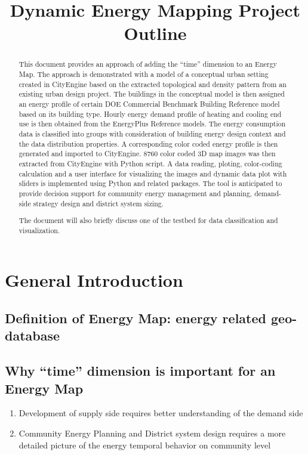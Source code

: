 \documentclass[12pt]{article}
\begin{document}
\title{Dynamic Energy Mapping Project Outline}
\maketitle
\begin{abstract}
  This document provides an approach of adding the ``time'' dimension
  to an Energy Map. The approach is demonstrated with a model of a
  conceptual urban setting created in CityEngine based on the
  extracted topological and density pattern from an existing urban
  design project. The buildings in the conceptual model is then
  assigned an energy profile of certain DOE Commercial Benchmark
  Building Reference model based on its building type. Hourly energy
  demand profile of heating and cooling end use is then obtained from
  the EnergyPlus Reference models. The energy consumption data is
  classified into groups with consideration of building energy design
  context and the data distribution properties. A corresponding color
  coded energy profile is then generated and imported to
  CityEngine. 8760 color coded 3D map images was then extracted from
  CityEngine with Python script. A data reading, ploting,
  color-coding calculation and a user interface for visualizing the
  images and dynamic data plot with sliders is implemented using
  Python and related packages. The tool is anticipated to provide
  decision support for community energy management and
  planning, demand-side strategy design and district system sizing.
  
  The document will also briefly discuss one of the testbed for data
  classification and visualization.
\end{abstract}
\newpage
\section{General Introduction}
\subsection{Definition of Energy Map: energy related geo-database}
\subsection{Why ``time'' dimension is important for an Energy Map}
\begin{enumerate}[label*=\arabic*.]
\item Development of supply side requires better understanding of
  the demand side
\item Community Energy Planning and District system design
  requires a more detailed picture of the energy temporal behavior
  on community level
\end{enumerate}
\end{document}
